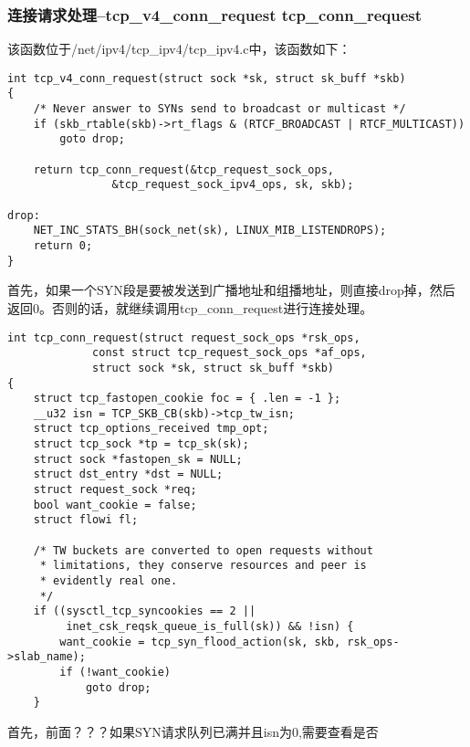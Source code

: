 \documentclass[11pt, a4paper,oneside]{book}
\theoremstyle{ocrenumbox}
\theoremstyle{purplenumbox}
\theoremstyle{blackbox}
\begin{document}
            \subsubsection{连接请求处理--tcp\_v4\_conn\_request  tcp\_conn\_request}
				该函数位于/net/ipv4/tcp\_ipv4/tcp\_ipv4.c中，该函数如下：
\begin{verbatim}
int tcp_v4_conn_request(struct sock *sk, struct sk_buff *skb)
{
	/* Never answer to SYNs send to broadcast or multicast */
	if (skb_rtable(skb)->rt_flags & (RTCF_BROADCAST | RTCF_MULTICAST))
		goto drop;

	return tcp_conn_request(&tcp_request_sock_ops,
				&tcp_request_sock_ipv4_ops, sk, skb);

drop:
	NET_INC_STATS_BH(sock_net(sk), LINUX_MIB_LISTENDROPS);
	return 0;
}
\end{verbatim}
				首先，如果一个SYN段是要被发送到广播地址和组播地址，则直接drop掉，然后返回0。否则的话，就继续调用tcp\_conn\_request进行连接处理。
\begin{verbatim}
int tcp_conn_request(struct request_sock_ops *rsk_ops,
		     const struct tcp_request_sock_ops *af_ops,
		     struct sock *sk, struct sk_buff *skb)
{
	struct tcp_fastopen_cookie foc = { .len = -1 };
	__u32 isn = TCP_SKB_CB(skb)->tcp_tw_isn;
	struct tcp_options_received tmp_opt;
	struct tcp_sock *tp = tcp_sk(sk);
	struct sock *fastopen_sk = NULL;
	struct dst_entry *dst = NULL;
	struct request_sock *req;
	bool want_cookie = false;
	struct flowi fl;

	/* TW buckets are converted to open requests without
	 * limitations, they conserve resources and peer is
	 * evidently real one.
	 */
	if ((sysctl_tcp_syncookies == 2 ||
	     inet_csk_reqsk_queue_is_full(sk)) && !isn) {
		want_cookie = tcp_syn_flood_action(sk, skb, rsk_ops->slab_name);
		if (!want_cookie)
			goto drop;
	}
\end{verbatim}
				首先，前面？？？如果SYN请求队列已满并且isn为0,需要查看是否
		
\end{document}
